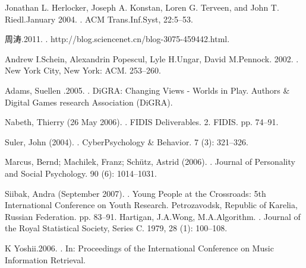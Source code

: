 \begin{thebibliography}{10}
Jonathan L. Herlocker, Joseph A. Konstan, Loren G. Terveen, and John T. Riedl.January 2004.
.
\newblock ACM Trans.Inf.Syst, 22:5–53.

周涛.2011.
.
\newblock http://blog.sciencenet.cn/blog-3075-459442.html.

Andrew I.Schein, Alexandrin Popescul, Lyle H.Ungar, David M.Pennock. 2002.
.
\newblock New York City, New York: ACM. 253–260.

Adams, Suellen .2005.
.
\newblock DiGRA: Changing Views - Worlds in Play. Authors \& Digital Games research Association (DiGRA).

Nabeth, Thierry (26 May 2006).
.
\newblock FIDIS Deliverables. 2. FIDIS. pp. 74–91.

Suler, John (2004).
.
\newblock CyberPsychology \& Behavior. 7 (3): 321–326.

Marcus, Bernd; Machilek, Franz; Schütz, Astrid (2006).
.
\newblock Journal of Personality and Social Psychology. 90 (6): 1014–1031.

Siibak, Andra (September 2007).
.
\newblock Young People at the Crossroads: 5th International Conference on Youth Research. Petrozavodsk, Republic of Karelia, Russian Federation. pp. 83–91.
Hartigan, J.A.Wong, M.A.Algorithm.
.
\newblock Journal of the Royal Statistical Society, Series C. 1979, 28 (1): 100–108.

K Yoshii.2006.
.
\newblock In: Proceedings of the International Conference on Music Information Retrieval.


\end{thebibliography}
